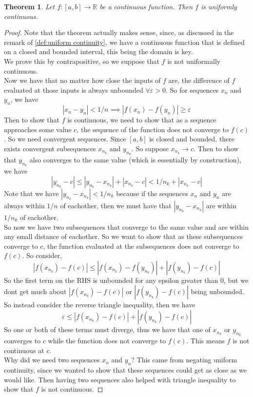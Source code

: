 \documentclass{article}
\newtheorem{theorem}{Theorem}[section]
\theoremstyle{definition}
\theoremstyle{remark}
\begin{document}
\vspace{.5cm}

\begin{theorem}\label{thm:if cnts on closed and bdd then unif cnts}
Let $f : [a, b] \to \mathbb{R}$ be a continuous function. Then $f$ is uniformly continuous.
\end{theorem}

\begin{proof}
Note that the theorem actually makes sense, since, as discussed in the remark of 
\ref{def:uniform continuity}, we have a continuous function that is
defined on a closed and bounded interval, this being the domain is key.\\
We prove this by contrapositive, so we suppose that $f$ is not uniformally continuous. \\
Now we have that no matter how close the inputs of $f$ are, the difference of $f$ evaluated 
at those inputs is always unbounded $\forall \varepsilon > 0$. So for sequences $x_n$ and $y_n$, we have
\[
|x_n - y_n| < 1/n \implies |f(x_n) - f(y_n) | \geq \varepsilon
\]
Then to show that $f$ is continuous, we need to show that as a sequence approaches 
some value $c$, the sequence of the function does not converge to $f(c)$. So we need
convergent sequences. Since $[a,b]$ is closed and bounded, there exists convergent 
subsequences $x_{n_k}$ and $y_{n_k}$. So suppose $x_{n_k} \to c$. Then to show 
that $y_{n_k}$ also converges to the same value (which is essentially by construction), we have
\[
|y_{n_k} - c| \leq |y_{n_k} - x_{n_k}| + |x_{n_k} - c| < 1/n_k + |x_{n_k} - c|
\]
Note that we have $|y_{n_k} - x_{n_k}| < 1/n_k$ because if the sequences $x_n$ and $y_n$ are always 
within $1/n$ of eachother, then we must have that $|y_{n_k} - x_{n_k}|$ are within $1/n_k$ of eachother.\\
So now we have two subsequences that converge to the same value and are within any small distance of eachother. 
So we want to show that as these subsequences converge to $c$, the function evaluated at the subsequences
does not converge to $f(c)$. So consider, 
\[
|f(x_{n_k}) - f(c)| \leq |f(x_{n_k}) - f(y_{n_k})| + |f(y_{n_k}) - f(c)|
\]
So the first term on the RHS is unbounded for any epsilon greater than 0, but we dont get 
much about $|f(x_{n_k}) - f(c)|$ or $|f(y_{n_k}) - f(c)|$ being unbounded. So instead 
consider the reverse triangle inequality, then we have \[
\varepsilon \leq |f(x_{n_k}) - f(c)| + |f(y_{n_k}) - f(c)|
\]
So one or both of these terms must diverge, thus we have that one of $x_{n_k}$ or $y_{n_k}$ converges
to $c$ while the function does not converge to $f(c)$. This means $f$ is not continuous at $c$. \\
Why did we need two sequences $x_n$ and $y_n$? This came from negating uniform continuity, since 
we wanted to show that these sequences could get as close as we would like. Then having two sequences also helped 
with triangle inequality to show that $f$ is not continuous. 
\end{proof}
\end{document}
